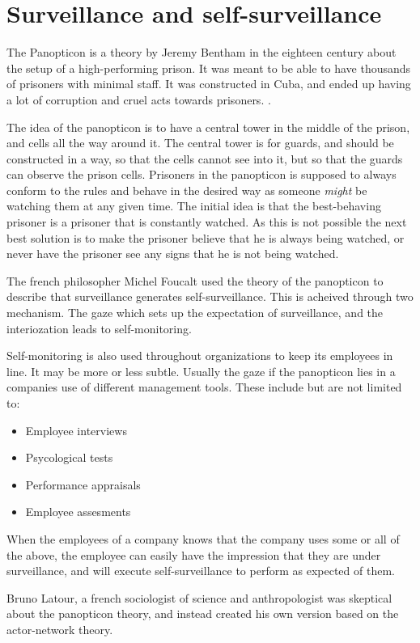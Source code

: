 \section{Surveillance and self-surveillance}
The Panopticon is a theory by Jeremy Bentham in the eighteen century about the setup of a high-performing prison. It was meant to be able to have thousands of prisoners with minimal staff. It was constructed in Cuba, and ended up having a lot of corruption and cruel acts towards prisoners. \cite{website:panopticon-idea}.

The idea of the panopticon is to have a central tower in the middle of the prison, and cells all the way around it. The central tower is for guards, and should be constructed in a way, so that the cells cannot see into it, but so that the guards can observe the prison cells. Prisoners in the panopticon is supposed to always conform to the rules and behave in the desired way as someone \textit{might} be watching them at any given time. The initial idea is that the best-behaving prisoner is a prisoner that is constantly watched. As this is not possible the next best solution is to make the prisoner believe that he is always being watched, or never have the prisoner see any signs that he is not being watched.\cite[P. 250]{bookref:organization-theory}

The french philosopher Michel Foucalt used the theory of the panopticon to describe that surveillance generates self-surveillance. This is acheived through two mechanism. The gaze which sets up the expectation of surveillance, and the interiozation leads to self-monitoring.

Self-monitoring is also used throughout organizations to keep its employees in line. It may be more or less subtle.\cite[P. 251]{bookref:organization-theory} Usually the gaze if the panopticon lies in a companies use of different management tools. These include but are not limited to:
\begin{itemize}
  \item{Employee interviews}
  \item{Psycological tests}
  \item{Performance appraisals}
  \item{Employee assesments}
\end{itemize}

When the employees of a company knows that the company uses some or all of the above, the employee can easily have the impression that they are under surveillance, and will execute self-surveillance to perform as expected of them.\cite[P. 251]{bookref:organization-theory}

Bruno Latour, a french sociologist of science and anthropologist was skeptical about the panopticon theory, and instead created his own version based on the actor-network theory.
